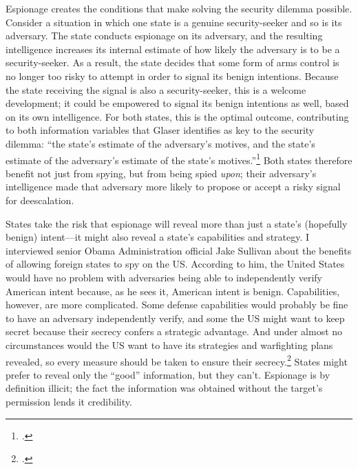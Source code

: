 \documentclass[12pt]{extarticle}
\begin{document}
Espionage creates the conditions that make solving the security dilemma possible. Consider a situation in which one state is a genuine security-seeker and so is its adversary. The state conducts espionage on its adversary, and the resulting intelligence increases its internal estimate of how likely the adversary is to be a security-seeker. As a result, the state decides that some form of arms control is no longer too risky to attempt in order to signal its benign intentions. Because the state receiving the signal is also a security-seeker, this is a welcome development; it could be empowered to signal its benign intentions as well, based on its own intelligence. For both states, this is the optimal outcome, contributing to both information variables that Glaser identifies as key to the security dilemma: \enquote{the state’s estimate of the adversary’s motives, and the state’s estimate of the adversary’s estimate of the state’s motives.}\footcite[34-35]{glaser_rational_2010} Both states therefore benefit not just from spying, but from being spied \emph{upon}; their adversary's intelligence made that adversary more likely to propose or accept a risky signal for deescalation.

States take the risk that espionage will reveal more than just a state's (hopefully benign) intent---it might also reveal a state's capabilities and strategy. I interviewed senior Obama Administration official Jake Sullivan about the benefits of allowing foreign states to spy on the US. According to him, the United States would have no problem with adversaries being able to independently verify American intent because, as he sees it, American intent is benign. Capabilities, however, are more complicated. Some defense capabilities would probably be fine to have an adversary independently verify, and some the US might want to keep secret because their secrecy confers a strategic advantage. And under almost no circumstances would the US want to have its strategies and warfighting plans revealed, so every measure should be taken to ensure their secrecy.\footcite{sullivan_personal_2019} States might prefer to reveal only the \enquote{good} information, but they can't. Espionage is by definition illicit; the fact the information was obtained without the target's permission lends it credibility.
\end{document}
